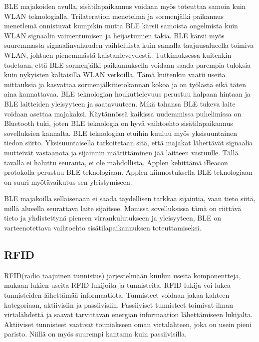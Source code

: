 BLE majakoiden avulla, sisätilapaikannus voidaan myös toteuttaa samoin kuin WLAN teknologialla\cite{BLE}. Trilateration menetelmä ja sormenjälki paikannus menetlemä onnistuvat kumpikin mutta BLE kärsii samoista ongelmista kuin WLAN signaalin vaimentumisen ja heijastumien takia. BLE kärsii myös suuremmasta signaalinvahuuden vaihteluista kuin samalla taajuusalueella toimiva WLAN, johtuen pienemmästä kaistanleveydestä\cite{BLE}. Tutkimuksessa\cite{BLE} kuitenkin todetaan, että BLE sormenjälki paikannuksella voidaan saada parempia tuloksia kuin nykyisten kaltaisilla WLAN verkoilla. Tämä kuitenkin vaatii useita mittauksia ja kasvattaa sormenjälkitietokannan kokoa ja on työlästä eikä täten aina kannattavaa.
BLE teknologian houkuttelevuus perustuu halpaan hintaan ja BLE laitteiden yleisyyteen ja saatavuuteen. Mikä tahansa BLE tukeva laite voidaan asettaa majakaksi\cite{BLE}. Käytännössä kaikissa uudemmissa puhelimissa on Bluetooth tuki, joten BLE teknologia on hyvä vaihtoehto sisätilapaikannus sovelluksien kannalta. BLE teknologian etuihin kuuluu myös yksisuuntainen tiedon siirto. Yksisuuntaisella tarkoitetaan sitä, että majakat lähettävät signaalia mutteivät vastaanota ja sijainnin määrittäminen jää laitteen vastuulle. Tällä tavalla ei haluttu seuranta, ei ole mahdollista. Applen kehittämä iBeacon protokolla perustuu BLE teknologiaan\cite{bluesentinel}. Applen kiinnostuksella BLE teknologiaan on suuri myötävaikutus sen yleistymiseen.

BLE majakoilla sellaisenaan ei saada täydellisen tarkkaa sijaintia, vaan tieto siitä, millä alueella seurattava laite sijaitsee. Monissa sovelluksissa tämä on riittävä tieto ja yhdistettynä pieneen virrankulutukseen ja yleisyyteen, BLE on varteenotettava vaihtoehto sisätilapaikannuksen toteuttamiseksi. 
\subsection{RFID}
RFID(radio taajuinen tunnistus) järjestelmään kuuluu useita komponentteja, mukaan lukien useita RFID lukijoita ja tunnisteita. RFID lukija voi lukea tunnisteiden lähettämää informaatiota. Tunnisteet voidaan jakaa kahteen kategoriaan, aktiivisiin ja passiivisiin. Passiiviset tunnisteet toimivat ilman virtalähdettä ja saavat tarvittavan energian informaation lähettämiseen lukijalta. Aktiiviset tunnisteet vaativat toimiakseen oman virtalähteen, joka on usein pieni paristo. Niillä on myös suurempi kantama kuin passiivisilla.\cite{E}

